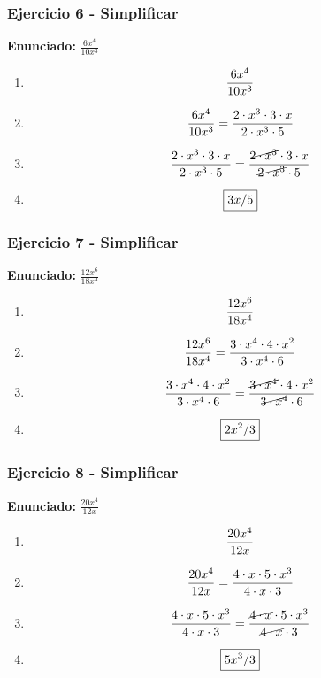 \documentclass[11pt,a4paper]{article}
\newcommand{\fitmath}[1]{%
\[
\setbox0=\hbox{$\displaystyle #1$}%
\ifdim\wd0>\linewidth
\resizebox{\linewidth}{!}{$\displaystyle #1$}%
\else
#1%
\fi
\]
}
\begin{document}
\vspace{0.12cm}
\subsubsection*{Ejercicio 6 - Simplificar}
\textbf{Enunciado:} $ \frac{6 x^{4}}{10 x^{3}} $\par
\begin{enumerate}[leftmargin=2em]
\item \fitmath{\frac{6 x^{4}}{10 x^{3}}}
\item \fitmath{\frac{6 x^{4}}{10 x^{3}}=\frac{2\cdot x^{3}\cdot 3\cdot x}{2\cdot x^{3}\cdot 5}}
\item \fitmath{\frac{2\cdot x^{3}\cdot 3\cdot x}{2\cdot x^{3}\cdot 5}=\frac{\cancel{2\cdot x^{3}}\cdot 3\cdot x}{\cancel{2\cdot x^{3}}\cdot 5}}
\item \fitmath{\boxed{3 x / 5}}
\end{enumerate}

\vspace{0.12cm}
\subsubsection*{Ejercicio 7 - Simplificar}
\textbf{Enunciado:} $ \frac{12 x^{6}}{18 x^{4}} $\par
\begin{enumerate}[leftmargin=2em]
\item \fitmath{\frac{12 x^{6}}{18 x^{4}}}
\item \fitmath{\frac{12 x^{6}}{18 x^{4}}=\frac{3\cdot x^{4}\cdot 4\cdot x^{2}}{3\cdot x^{4}\cdot 6}}
\item \fitmath{\frac{3\cdot x^{4}\cdot 4\cdot x^{2}}{3\cdot x^{4}\cdot 6}=\frac{\cancel{3\cdot x^{4}}\cdot 4\cdot x^{2}}{\cancel{3\cdot x^{4}}\cdot 6}}
\item \fitmath{\boxed{2 x^{2} / 3}}
\end{enumerate}

\vspace{0.12cm}
\subsubsection*{Ejercicio 8 - Simplificar}
\textbf{Enunciado:} $ \frac{20 x^{4}}{12 x} $\par
\begin{enumerate}[leftmargin=2em]
\item \fitmath{\frac{20 x^{4}}{12 x}}
\item \fitmath{\frac{20 x^{4}}{12 x}=\frac{4\cdot x\cdot 5\cdot x^{3}}{4\cdot x\cdot 3}}
\item \fitmath{\frac{4\cdot x\cdot 5\cdot x^{3}}{4\cdot x\cdot 3}=\frac{\cancel{4\cdot x}\cdot 5\cdot x^{3}}{\cancel{4\cdot x}\cdot 3}}
\item \fitmath{\boxed{5 x^{3} / 3}}
\end{enumerate}
\end{document}
